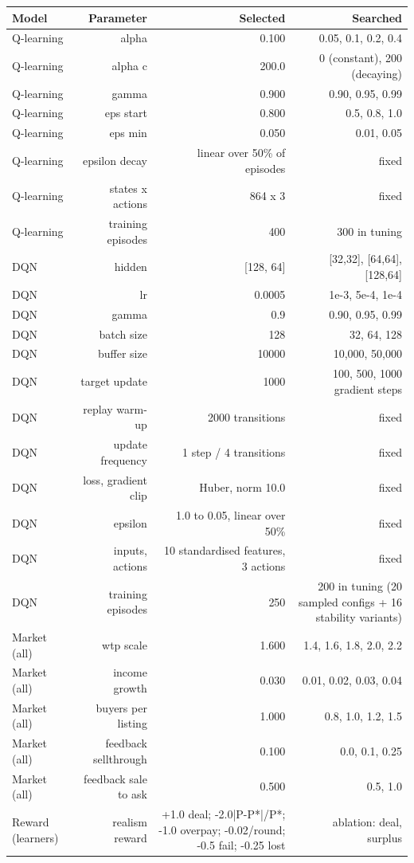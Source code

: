 \begin{tabular}{lrrr}
\toprule
Model & Parameter & Selected & Searched \\
\midrule
Q-learning & alpha & 0.100 & 0.05, 0.1, 0.2, 0.4 \\
Q-learning & alpha c & 200.0 & 0 (constant), 200 (decaying) \\
Q-learning & gamma & 0.900 & 0.90, 0.95, 0.99 \\
Q-learning & eps start & 0.800 & 0.5, 0.8, 1.0 \\
Q-learning & eps min & 0.050 & 0.01, 0.05 \\
Q-learning & epsilon decay & linear over 50\% of episodes & fixed \\
Q-learning & states x actions & 864 x 3 & fixed \\
Q-learning & training episodes & 400 & 300 in tuning \\
DQN & hidden & [128, 64] & [32,32], [64,64], [128,64] \\
DQN & lr & 0.0005 & 1e-3, 5e-4, 1e-4 \\
DQN & gamma & 0.9 & 0.90, 0.95, 0.99 \\
DQN & batch size & 128 & 32, 64, 128 \\
DQN & buffer size & 10000 & 10,000, 50,000 \\
DQN & target update & 1000 & 100, 500, 1000 gradient steps \\
DQN & replay warm-up & 2000 transitions & fixed \\
DQN & update frequency & 1 step / 4 transitions & fixed \\
DQN & loss, gradient clip & Huber, norm 10.0 & fixed \\
DQN & epsilon & 1.0 to 0.05, linear over 50\% & fixed \\
DQN & inputs, actions & 10 standardised features, 3 actions & fixed \\
DQN & training episodes & 250 & 200 in tuning (20 sampled configs + 16 stability variants) \\
Market (all) & wtp scale & 1.600 & 1.4, 1.6, 1.8, 2.0, 2.2 \\
Market (all) & income growth & 0.030 & 0.01, 0.02, 0.03, 0.04 \\
Market (all) & buyers per listing & 1.000 & 0.8, 1.0, 1.2, 1.5 \\
Market (all) & feedback sellthrough & 0.100 & 0.0, 0.1, 0.25 \\
Market (all) & feedback sale to ask & 0.500 & 0.5, 1.0 \\
Reward (learners) & realism reward & +1.0 deal; -2.0|P-P*|/P*; -1.0 overpay; -0.02/round; -0.5 fail; -0.25 lost & ablation: deal, surplus \\
\bottomrule
\end{tabular}
